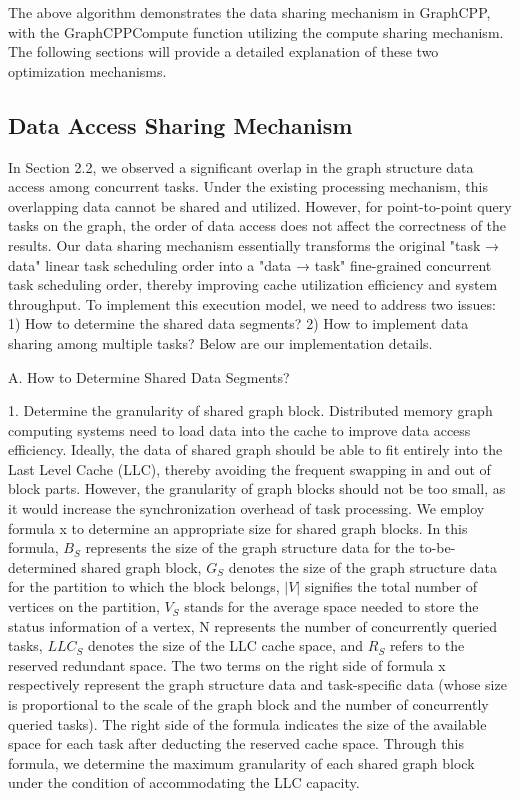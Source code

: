 \documentclass[lettersize,journal]{IEEEtran} %
\begin{document}
The above algorithm demonstrates the data sharing mechanism in GraphCPP, with the GraphCPPCompute function utilizing the compute sharing mechanism. The following sections will provide a detailed explanation of these two optimization mechanisms.

\subsection{Data Access Sharing Mechanism}
In Section 2.2, we observed a significant overlap in the graph structure data access among concurrent tasks. Under the existing processing mechanism, this overlapping data cannot be shared and utilized. However, for point-to-point query tasks on the graph, the order of data access does not affect the correctness of the results. Our data sharing mechanism essentially transforms the original "task → data" linear task scheduling order into a "data → task" fine-grained concurrent task scheduling order, thereby improving cache utilization efficiency and system throughput. To implement this execution model, we need to address two issues: 1) How to determine the shared data segments? 2) How to implement data sharing among multiple tasks? Below are our implementation details.

A. How to Determine Shared Data Segments?

1. Determine the granularity of shared graph block. Distributed memory graph computing systems need to load data into the cache to improve data access efficiency. Ideally, the data of shared graph should be able to fit entirely into the Last Level Cache (LLC), thereby avoiding the frequent swapping in and out of block parts. However, the granularity of graph blocks should not be too small, as it would increase the synchronization overhead of task processing. We employ formula x to determine an appropriate size for shared graph blocks. In this formula, $B_S$ represents the size of the graph structure data for the to-be-determined shared graph block, $G_S$ denotes the size of the graph structure data for the partition to which the block belongs, $|V|$ signifies the total number of vertices on the partition, $V_S$ stands for the average space needed to store the status information of a vertex, N represents the number of concurrently queried tasks, $LLC_S$ denotes the size of the LLC cache space, and $R_S$ refers to the reserved redundant space. The two terms on the right side of formula x respectively represent the graph structure data and task-specific data (whose size is proportional to the scale of the graph block and the number of concurrently queried tasks). The right side of the formula indicates the size of the available space for each task after deducting the reserved cache space. Through this formula, we determine the maximum granularity of each shared graph block under the condition of accommodating the LLC capacity.
\end{document}
